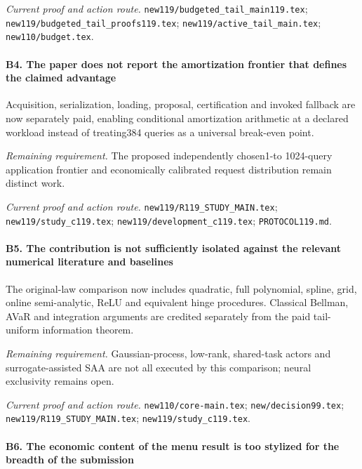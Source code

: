 \par\emph{Current proof and action route.} \nolinkurl{new119/budgeted_tail_main119.tex}; \nolinkurl{new119/budgeted_tail_proofs119.tex}; \nolinkurl{new119/active_tail_main.tex}; \nolinkurl{new110/budget.tex}.

\paragraph{B4. The paper does not report the amortization frontier that defines the claimed advantage}

Acquisition, serialization, loading, proposal, certification and invoked fallback are now separately paid, enabling conditional amortization arithmetic at a declared workload instead of treating384 queries as a universal break-even point.

\par\emph{Remaining requirement.} The proposed independently chosen1-to 1024-query application frontier and economically calibrated request distribution remain distinct work.

\par\emph{Current proof and action route.} \nolinkurl{new119/R119_STUDY_MAIN.tex}; \nolinkurl{new119/study_c119.tex}; \nolinkurl{new119/development_c119.tex}; \nolinkurl{PROTOCOL119.md}.

\paragraph{B5. The contribution is not sufficiently isolated against the relevant numerical literature and baselines}

The original-law comparison now includes quadratic, full polynomial, spline, grid, online semi-analytic, ReLU and equivalent hinge procedures. Classical Bellman, AVaR and integration arguments are credited separately from the paid tail-uniform information theorem.

\par\emph{Remaining requirement.} Gaussian-process, low-rank, shared-task actors and surrogate-assisted SAA are not all executed by this comparison; neural exclusivity remains open.

\par\emph{Current proof and action route.} \nolinkurl{new110/core-main.tex}; \nolinkurl{new/decision99.tex}; \nolinkurl{new119/R119_STUDY_MAIN.tex}; \nolinkurl{new119/study_c119.tex}.

\paragraph{B6. The economic content of the menu result is too stylized for the breadth of the submission}

